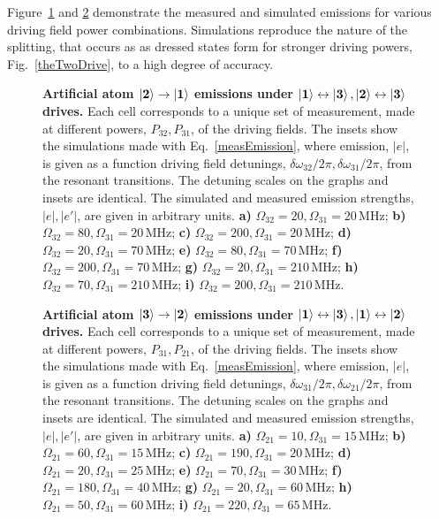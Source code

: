  Figure~\ref{meas12} and \ref{meas32} demonstrate the measured and simulated emissions for various driving field power combinations. Simulations reproduce the nature of the splitting, that occurs as as dressed states form for stronger driving powers, Fig.~\ref{theTwoDrive}, to a high degree of accuracy.

\newcommand{\lastGraph}[2]{$ \Omega_{32} = #1, \Omega_{31}=#2\,$MHz}
\newcommand{\preGraph}[2]{$ \Omega_{21} = #1, \Omega_{31}=#2\,$MHz}
  \begin{figure}
  	\caption{\small\textbf{Artificial atom $ \mathbf{\ket{2}\rightarrow\ket{1}} $ emissions under $ \mathbf{\ket{1}\leftrightarrow\Ket{3}, \ket{2}\leftrightarrow\Ket{3}} $ drives.} Each cell corresponds to a unique set of measurement, made at different powers, $P_{32}, P_{31} $, of the driving fields. The insets show the simulations made with Eq.~\eqref{measEmission}, where emission, $ |e| $, is given as a function driving field detunings, $ \delta\omega_{32}/2\pi, \delta\omega_{31}/2\pi $, from the resonant transitions. The detuning scales on the graphs and insets are identical. The simulated and measured emission strengths, $ |e|, |e'| $, are given in arbitrary units. \textbf{a)} \lastGraph{20}{20}; \textbf{b)} \lastGraph{80}{20}; \textbf{c)} \lastGraph{200}{20}; \textbf{d)} \lastGraph{20}{70}; \textbf{e)} \lastGraph{80}{70}; \textbf{f)} \lastGraph{200}{70}; \textbf{g)} \lastGraph{20}{210}; \textbf{h)} \lastGraph{70}{210}; \textbf{i)} \lastGraph{200}{210}.}
  	\label{meas12}
  \end{figure}

  \begin{figure}
	\caption{\small\textbf{Artificial atom $ \mathbf{\ket{3}\rightarrow\ket{2}} $ emissions under $ \mathbf{\ket{1}\leftrightarrow\Ket{3}, \ket{1}\leftrightarrow\Ket{2}} $ drives.} Each cell corresponds to a unique set of measurement, made at different powers, $P_{31}, P_{21} $, of the driving fields. The insets show the simulations made with Eq.~\eqref{measEmission}, where emission, $ |e| $, is given as a function driving field detunings, $ \delta\omega_{31}/2\pi, \delta\omega_{21}/2\pi $, from the resonant transitions. The detuning scales on the graphs and insets are identical. The simulated and measured emission strengths, $ |e|, |e'| $, are given in arbitrary units. \textbf{a)} \preGraph{10}{15}; \textbf{b)} \preGraph{60}{15}; \textbf{c)} \preGraph{190}{20}; \textbf{d)} \preGraph{20}{25}; \textbf{e)} \preGraph{70}{30}; \textbf{f)} \preGraph{180}{40}; \textbf{g)} \preGraph{20}{60}; \textbf{h)} \preGraph{50}{60}; \textbf{i)} \preGraph{220}{65}.}
  	\label{meas32}
  \end{figure}
 
